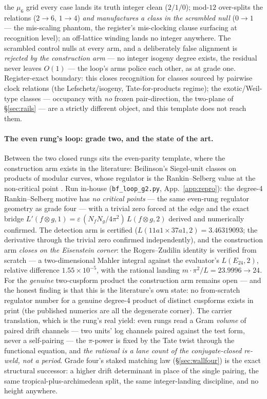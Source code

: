 \documentclass[11pt]{article}
\theoremstyle{definition}
\theoremstyle{remark}
\begin{document}
the $\mu_6$ grid every case lands its truth integer clean ($2/1/0$);
mod-$12$ over-splits the relations ($2\to6$, $1\to4$) \emph{and
manufactures a class in the scrambled null} ($0\to1$ --- the mis-scaling
phantom, the register's mis-clocking clause surfacing at recognition
level); an off-lattice winding lands no integer anywhere. The scrambled
control nulls at every arm, and a deliberately
false alignment is \emph{rejected by the construction arm} --- no integer
isogeny degree exists, the residual never leaves $O(1)$ --- the loop's
arms police each other, as at grade one. Register-exact boundary: this
closes recognition for classes sourced by pairwise clock relations (the
Lefschetz/isogeny, Tate-for-products regime); the exotic/Weil-type classes
--- occupancy with \emph{no} frozen pair-direction, the two-plane of
\S\ref{sec:rails} --- are a strictly different object, and this template
does not reach them.

\paragraph{The even rung's loop: grade two, and the state of the art.}
Between the two closed rungs sits the even-parity template, where the
construction arm exists in the literature: Beilinson's Siegel-unit classes
on products of modular curves, whose regulator is the Rankin--Selberg value
at the non-critical point \cite{Beilinson1985,LLZ,BDR,BrunaultChida}. Run
in-house (\texttt{bf\_loop\_g2.py}, App.~\ref{app:repro}): the degree-4
Rankin--Selberg motive has \emph{no critical points} --- the same even-rung
regulator geometry as grade four --- with a trivial zero forced at the edge
and the exact bridge $L'(f\otimes g,1)=\varepsilon\,(N_fN_g/4\pi^2)\,
L(f\otimes g,2)$ derived and numerically confirmed. The detection arm is
certified ($L(11a1\times37a1,2)=3.46319093$; the derivative through the
trivial zero confirmed independently), and the construction arm
\emph{closes on the Eisenstein corner}: the Rogers--Zudilin identity
\cite{RogersZudilin} is verified from scratch --- a two-dimensional Mahler
integral against the evaluator's $L(E_{24},2)$, relative difference
$1.55\times10^{-5}$, with the rational landing $m\cdot\pi^2/L=23.9996\to24$.
For the \emph{genuine} two-cuspform product the construction arm remains
open --- and the honest finding is that this is the literature's own state:
no from-scratch regulator number for a genuine degree-4 product of distinct
cuspforms exists in print (the published numerics are all the degenerate
corner). The carrier translation, which is the rung's real yield: even rungs
read a Gram \emph{volume} of paired drift channels --- two units' log
channels paired against the test form, never a self-pairing --- the
$\pi$-power is fixed by the Tate twist through the functional equation, and
\emph{the rational is a lane count of the conjugate-closed re-weld, not a
period}. Grade four's staked matching law (\S\ref{sec:wallfour}) is the
exact structural successor: a higher drift determinant in place of the
single pairing, the same tropical-plus-archimedean split, the same
integer-landing discipline, and no height anywhere.
\end{document}
